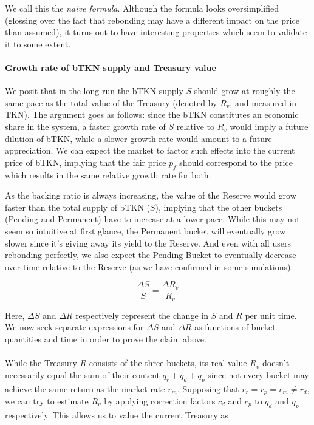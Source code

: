 \documentclass{article}
\begin{document}
We call this the \textit{naive formula}. Although the formula looks oversimplified (glossing over the fact that rebonding may have a different impact on the price than assumed), it turns out to have interesting properties which seem to validate it to some extent.

\paragraph{Growth rate of bTKN supply and Treasury value}
We posit that in the long run the bTKN supply $S$ should grow at roughly the same pace as the total value of the Treasury (denoted by $R_v$, and measured in TKN). The argument goes as follows: since the bTKN constitutes an economic share in the system, a faster growth rate of $S$ relative to $R_v$ would imply a future dilution of bTKN, while a slower growth rate would amount to a future appreciation. We can expect the market to factor such effects into the current price of bTKN, implying that the fair price $p_f$ should correspond to the price which results in the same relative growth rate for both.

As the backing ratio is always increasing, the value of the Reserve would grow faster than the total supply of bTKN ($S$), implying that the other buckets (Pending and Permanent) have to increase at a lower pace. While this may not seem so intuitive at first glance, the Permanent bucket will eventually grow slower since it's giving away its yield to the Reserve. And even with all users rebonding perfectly, we also expect the Pending Bucket to eventually decrease over time relative to the Reserve (as we have confirmed in some simulations).

\begin{equation}
  \label{eq:same_growth_rate}
  \frac{\Delta S}{S} = \frac{\Delta R_v}{R_v}
\end{equation}


Here, $\Delta S$ and $\Delta R$ respectively represent the change in $S$ and $R$ per unit time.  We now seek separate expressions for $\Delta S$ and $\Delta R$ as functions of bucket quantities and time in order to prove the claim above.

\paragraph{}
While the Treasury $R$ consists of the three buckets, its real value $R_v$ doesn't necessarily equal the sum of their content $q_r+q_d+q_p$ since not every bucket may achieve the same return as the market rate $r_m$. Supposing that $r_r=r_p=r_m \neq r_d$, we can try to estimate $R_v$ by applying correction factors $c_d$ and $c_p$ to $q_d$ and $q_p$ respectively. This allows us to value the current Treasury as
\end{document}
